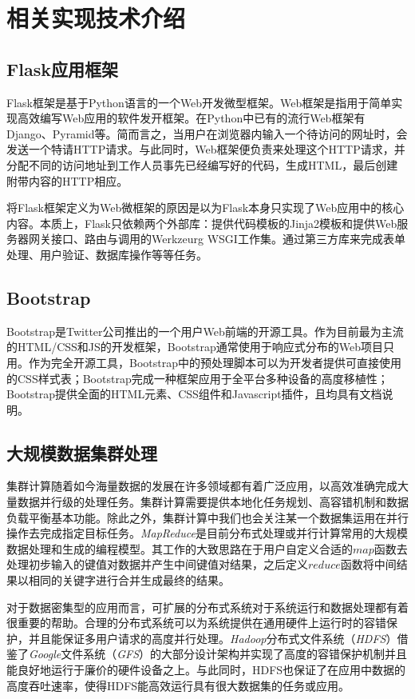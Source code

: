 \section{相关实现技术介绍}
\label{sec:technology}

\subsection{Flask应用框架}
\label{subsec:flask}
Flask框架是基于Python语言的一个Web开发微型框架。Web框架是指用于简单实现高效编写Web应用的软件发开框架。在Python中已有的流行Web框架有Django、Pyramid等。简而言之，当用户在浏览器内输入一个待访问的网址时，会发送一个特请HTTP请求。与此同时，Web框架便负责来处理这个HTTP请求，并分配不同的访问地址到工作人员事先已经编写好的代码，生成HTML，最后创建附带内容的HTTP相应。

将Flask框架定义为Web微框架的原因是以为Flask本身只实现了Web应用中的核心内容。本质上，Flask只依赖两个外部库：提供代码模板的Jinja2模板和提供Web服务器网关接口、路由与调用的Werkzeurg WSGI工作集\cite{flasklibrary}。通过第三方库来完成表单处理、用户验证、数据库操作等等任务。

\subsection{Bootstrap}
\label{subsec:bootstrap}
Bootstrap是Twitter公司推出的一个用户Web前端的开源工具。作为目前最为主流的HTML/CSS和JS的开发框架，Bootstrap通常使用于响应式分布的Web项目只用。作为完全开源工具，Bootstrap中的预处理脚本可以为开发者提供可直接使用的CSS样式表；Bootstrap完成一种框架应用于全平台多种设备的高度移植性；Bootstrap提供全面的HTML元素、CSS组件和Javascript插件，且均具有文档说明。




\subsection{大规模数据集群处理}
\label{subsec:bigdata-intro}
集群计算随着如今海量数据的发展在许多领域都有着广泛应用，以高效准确完成大量数据并行级的处理任务。集群计算需要提供本地化任务规划、高容错机制和数据负载平衡基本功能。除此之外，集群计算中我们也会关注某一个数据集运用在并行操作去完成指定目标任务。\emph{MapReduce}\cite{dean2008mapreduce}是目前分布式处理或并行计算常用的大规模数据处理和生成的编程模型。其工作的大致思路在于用户自定义合适的$map$函数去处理初步输入的键值对数据并产生中间键值对结果，之后定义$reduce$函数将中间结果以相同的关键字进行合并生成最终的结果。

对于数据密集型的应用而言，可扩展的分布式系统对于系统运行和数据处理都有着很重要的帮助。合理的分布式系统可以为系统提供在通用硬件上运行时的容错保护，并且能保证多用户请求的高度并行处理。\emph{Hadoop}分布式文件系统（\emph{HDFS}）借鉴了\emph{Google}文件系统（\emph{GFS}）的大部分设计架构并实现了高度的容错保护机制并且能良好地运行于廉价的硬件设备之上。与此同时，HDFS也保证了在应用中数据的高度吞吐速率，使得HDFS能高效运行具有很大数据集的任务或应用。

